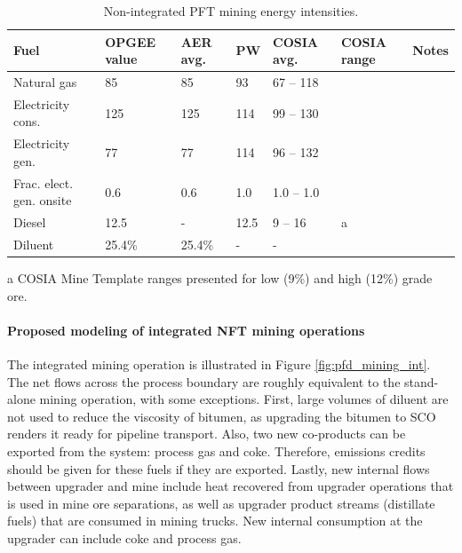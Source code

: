 \documentclass[11pt]{report}
\begin{document}
\begin{table}
\caption{Non-integrated PFT mining energy intensities.}
\label{tab:mining_nonint_energy}
\begin{scriptsize}
\begin{tabularx}{1\columnwidth}{p{}p{}p{}p{}p{} p{}p{}}
\toprule
Fuel & OPGEE value & AER avg. & PW & COSIA avg. & COSIA range & Notes\\
\midrule
Natural gas & 85 & 85 & 93 & 67 -- 118	& \\
Electricity	cons.	& 125	& 125	& 114	& 99 -- 130		& \\
Electricity gen.		& 77		& 77		& 114	& 96 -- 132		& \\
Frac. elect. gen. onsite	& 0.6 	& 0.6		& 1.0		& 1.0 -- 1.0	& \\
Diesel			& 12.5	& -		& 12.5	& 9 -- 16			& a \\	
Diluent			& 25.4\%	& 25.4\%	& -		& -				& \\
\bottomrule
\end{tabularx}
\begin{tablenotes}
\item[a] COSIA Mine Template ranges presented for low (9\%) and high (12\%) grade ore.
\end{tablenotes}
\end{scriptsize}
\end{table}

\paragraph{Proposed modeling of integrated NFT mining operations}


The integrated mining operation is illustrated in Figure \ref{fig:pfd_mining_int}.  The net flows across the process boundary are roughly equivalent to the stand-alone mining operation, with some exceptions. First, large volumes of diluent are not used to reduce the viscosity of bitumen, as upgrading the bitumen to SCO renders it ready for pipeline transport.  Also, two new co-products can be exported from the system: process gas and coke.  Therefore, emissions credits should be given for these fuels if they are exported.  Lastly, new internal flows between upgrader and mine include heat recovered from upgrader operations that is used in mine ore separations, as well as upgrader product streams (distillate fuels) that are consumed in mining trucks.  New internal consumption at the upgrader can include coke and process gas.
\end{document}
